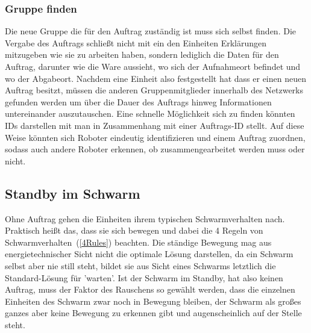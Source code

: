 \subsubsection*{Gruppe finden}
Die neue Gruppe die für den Auftrag zuständig ist muss sich selbst finden.
Die Vergabe des Auftrags schließt nicht mit ein den Einheiten Erklärungen mitzugeben wie sie zu arbeiten haben, sondern lediglich die Daten für den Auftrag, darunter wie die Ware aussieht, wo sich der Aufnahmeort befindet und wo der Abgabeort.
Nachdem eine Einheit also festgestellt hat dass er einen neuen Auftrag besitzt, müssen die anderen Gruppenmitglieder innerhalb des Netzwerks gefunden werden um über die Dauer des Auftrags hinweg Informationen untereinander auszutauschen.
Eine schnelle Möglichkeit sich zu finden könnten IDs darstellen mit man in Zusammenhang mit einer Auftrags-ID stellt. Auf diese Weise könnten sich Roboter eindeutig identifizieren und einem Auftrag zuordnen, sodass auch andere Roboter erkennen, ob zusammengearbeitet werden muss oder nicht.

\subsection*{Standby im Schwarm}\label{subsec:StandbyImSchwarm}
Ohne Auftrag gehen die Einheiten ihrem typischen Schwarmverhalten nach. Praktisch heißt das, dass sie sich bewegen und dabei die 4 Regeln von Schwarmverhalten~(\autoref{4Rules}) beachten.
Die ständige Bewegung mag aus energietechnischer Sicht nicht die optimale Lösung darstellen, da ein Schwarm selbst aber nie still steht, bildet sie aus Sicht eines Schwarms letztlich die Standard-Lösung für 'warten'.
Ist der Schwarm im Standby, hat also keinen Auftrag, muss der Faktor des Rauschens so gewählt werden, dass die einzelnen Einheiten des Schwarm zwar noch in Bewegung bleiben, der Schwarm als großes ganzes aber keine Bewegung zu erkennen gibt und augenscheinlich auf der Stelle steht.

